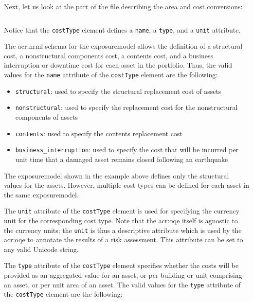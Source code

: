 Next, let us look at the part of the file describing the area and cost
conversions:

\inputminted[firstline=10,firstnumber=10,lastline=15,fontsize=\footnotesize,frame=single,linenos,bgcolor=lightgray]{xml}{oqum/risk/verbatim/input_exposure_minimal.xml}

Notice that the \Verb+costType+ element defines a \Verb+name+, a \Verb+type+, 
and a \Verb+unit+ attribute.

The \gls{acr:nrml} schema for the \gls{exposuremodel} allows the definition of
a structural cost, a nonstructural components cost, a contents cost, and a
business interruption or downtime cost for each \gls{asset} in the portfolio.
Thus, the valid values for the \Verb+name+ attribute of the \Verb+costType+
element are the following:

\begin{itemize}

  \item \Verb+structural+: used to specify the structural replacement cost
    of assets

  \item \Verb+nonstructural+: used to specify the replacement cost for the
    nonstructural components of assets

  \item \Verb+contents+: used to specify the contents replacement cost

  \item \Verb+business_interruption+: used to specify the cost that will be 
    incurred per unit time that a damaged asset remains closed following an 
    earthquake

\end{itemize}

The \gls{exposuremodel} shown in the example above defines only the structural
values for the \glspl{asset}. However, multiple cost types can be defined for
each \gls{asset} in the same \gls{exposuremodel}.

The \Verb+unit+ attribute of the \Verb+costType+ element is used for
specifying the currency unit for the corresponding cost type. Note that the
\glsdesc{acr:oqe} itself is agnostic to the currency units; the \Verb+unit+ is
thus a descriptive attribute which is used by the \glsdesc{acr:oqe} to annotate the
results of a risk assessment. This attribute can be set to any valid Unicode
string.

The \Verb+type+ attribute of the \Verb+costType+ element specifies whether the
costs will be provided as an aggregated value for an asset, or per building or
unit comprising an \gls{asset}, or per unit area of an \gls{asset}. The valid
values for the \Verb+type+ attribute of the \Verb+costType+ element are the
following:


